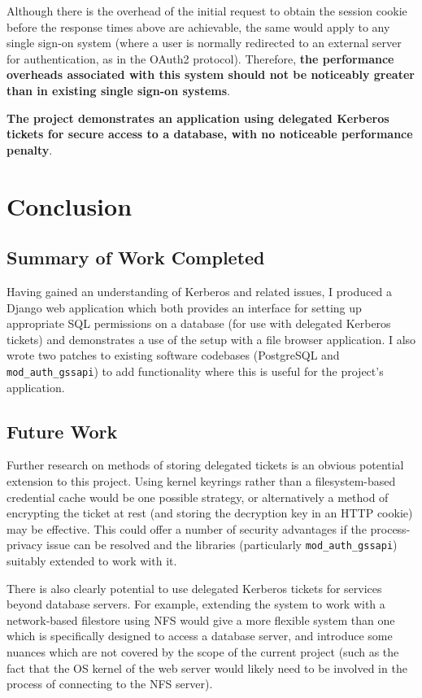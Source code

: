 \documentclass[12pt]{report}
\begin{document}
Although there is the overhead of the initial request to obtain the session cookie before the response times above are achievable, the same would apply to any single sign-on system (where a user is normally redirected to an external server for authentication, as in the OAuth2 protocol). Therefore, \textbf{the performance overheads associated with this system should not be noticeably greater than in existing single sign-on systems}.

\textbf{The project demonstrates an application using delegated Kerberos tickets for secure access to a database, with no noticeable performance penalty}.

\chapter{Conclusion}
\section{Summary of Work Completed}
Having gained an understanding of Kerberos and related issues, I produced a Django web application which both provides an interface for setting up appropriate SQL permissions on a database (for use with delegated Kerberos tickets) and demonstrates a use of the setup with a file browser application. I also wrote two patches to existing software codebases (PostgreSQL and \verb+mod_auth_gssapi+) to add functionality where this is useful for the project's application.

\section{Future Work}
\label{sec:future_work}
Further research on methods of storing delegated tickets is an obvious potential extension to this project. Using kernel keyrings rather than a filesystem-based credential cache would be one possible strategy, or alternatively a method of encrypting the ticket at rest (and storing the decryption key in an HTTP cookie) may be effective. This could offer a number of security advantages if the process-privacy issue can be resolved and the libraries (particularly \verb+mod_auth_gssapi+) suitably extended to work with it.

There is also clearly potential to use delegated Kerberos tickets for services beyond database servers. For example, extending the system to work with a network-based filestore using NFS would give a more flexible system than one which is specifically designed to access a database server, and introduce some nuances which are not covered by the scope of the current project (such as the fact that the OS kernel of the web server would likely need to be involved in the process of connecting to the NFS server).
\end{document}
